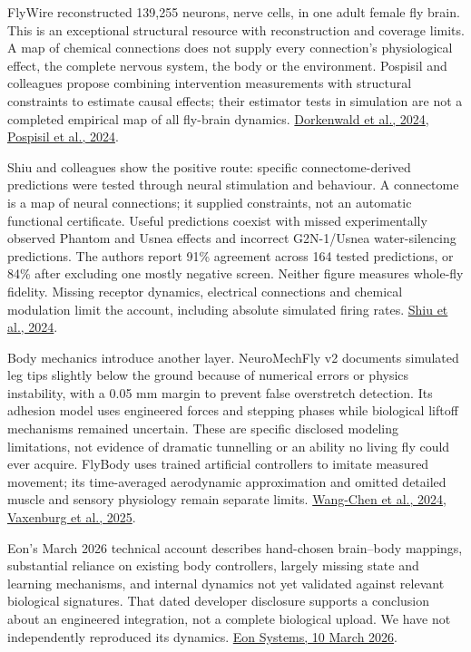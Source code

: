 FlyWire reconstructed 139,255 neurons, nerve cells, in one adult female fly brain. This is an exceptional structural resource with reconstruction and coverage limits. A map of chemical connections does not supply every connection's physiological effect, the complete nervous system, the body or the environment. Pospisil and colleagues propose combining intervention measurements with structural constraints to estimate causal effects; their estimator tests in simulation are not a completed empirical map of all fly-brain dynamics. \href{https://www.nature.com/articles/s41586-024-07558-y}{Dorkenwald et al., 2024}, \href{https://www.nature.com/articles/s41586-024-07982-0}{Pospisil et al., 2024}.\par

Shiu and colleagues show the positive route: specific connectome-derived predictions were tested through neural stimulation and behaviour. A connectome is a map of neural connections; it supplied constraints, not an automatic functional certificate. Useful predictions coexist with missed experimentally observed Phantom and Usnea effects and incorrect G2N-1/Usnea water-silencing predictions. The authors report 91\% agreement across 164 tested predictions, or 84\% after excluding one mostly negative screen. Neither figure measures whole-fly fidelity. Missing receptor dynamics, electrical connections and chemical modulation limit the account, including absolute simulated firing rates. \href{https://pmc.ncbi.nlm.nih.gov/articles/PMC11446845/}{Shiu et al., 2024}.\par

Body mechanics introduce another layer. NeuroMechFly v2 documents simulated leg tips slightly below the ground because of numerical errors or physics instability, with a 0.05 mm margin to prevent false overstretch detection. Its adhesion model uses engineered forces and stepping phases while biological liftoff mechanisms remained uncertain. These are specific disclosed modeling limitations, not evidence of dramatic tunnelling or an ability no living fly could ever acquire. FlyBody uses trained artificial controllers to imitate measured movement; its time-averaged aerodynamic approximation and omitted detailed muscle and sensory physiology remain separate limits. \href{https://gizemozd.github.io/assets/pdf/2024_neuromechflyv2.pdf}{Wang-Chen et al., 2024}, \href{https://pmc.ncbi.nlm.nih.gov/articles/PMC12310536/}{Vaxenburg et al., 2025}.\par

Eon's March 2026 technical account describes hand-chosen brain--body mappings, substantial reliance on existing body controllers, largely missing state and learning mechanisms, and internal dynamics not yet validated against relevant biological signatures. That dated developer disclosure supports a conclusion about an engineered integration, not a complete biological upload. We have not independently reproduced its dynamics. \href{https://eon.systems/updates/embodied-brain-emulation}{Eon Systems, 10 March 2026}.\par

